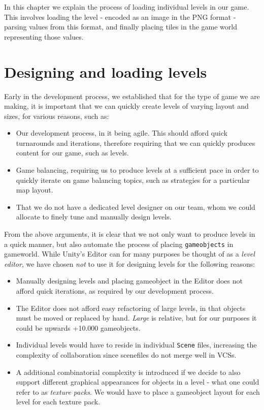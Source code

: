 In this chapter we explain the process of loading individual levels in our
game. This involves loading the level - encoded as an image in the PNG format -
parsing values from this format, and finally placing tiles in the game world
representing those values.

\section{Designing and loading levels}
Early in the development process, we established that for the type of game we
are making, it is important that we can quickly create levels of varying layout
and sizes, for various reasons, such as:
\begin{itemize}
    \item Our development process, in it being agile. This should afford quick
        turnarounds and iterations, therefore requiring that we can quickly
        produces content for our game, such as levels.
    \item Game balancing, requiring us to produce levels at a sufficient pace in
        order to quickly iterate on game balancing topics, such as strategies
        for a particular map layout.
    \item That we do not have a dedicated level designer on our team, whom we
        could allocate to finely tune and manually design levels.
\end{itemize}

From the above arguments, it is clear that we not only want to produce levels
in a quick manner, but also automate the process of placing
\texttt{gameobjects} in gameworld. While Unity's Editor can for many purposes
be thought of as a \textit{level editor}, we have chosen \textit{not} to use it
for designing levels for the following reasons:
\begin{itemize}
    \item Manually designing levels and placing gameobject in the Editor does
        not afford quick iterations, as required by our development process.
    \item The Editor does not afford easy refactoring of large levels, in that
        objects must be moved or replaced by hand. \textit{Large} is relative,
        but for our purposes it could be upwards +10.000 gameobjects.
    \item Individual levels would have to reside in individual \texttt{Scene}
        files, increasing the complexity of collaboration since scenefiles do
        not merge well in VCSs.
    \item A additional combinatorial complexity is introduced if we decide to
        also support different graphical appearances for objects in a level -
        what one could refer to as \textit{texture packs}. We would have
        to place a gameobject layout for each level for each texture pack.
\end{itemize}

